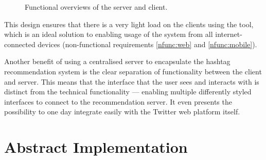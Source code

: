 \documentclass[11pt,a4paper]{report}
\begin{document}
\begin{figure}[htpb]
    \centering
    \caption{Functional overviews of the server and client.}
\end{figure}

This design ensures that there is a very light load on the clients using the tool, which is an ideal solution to enabling usage of the system from all internet-connected devices (non-functional requirements \ref{nfunc:web} and \ref{nfunc:mobile}).

Another benefit of using a centralised server to encapsulate the hashtag recommendation system is the clear separation of functionality between the client and server. This means that the interface that the user sees and interacts with is distinct from the technical functionality --- enabling multiple differently styled interfaces to connect to the recommendation server. It even presents the possibility to one day integrate easily with the Twitter web platform itself.

\section{Abstract Implementation}
\end{document}
